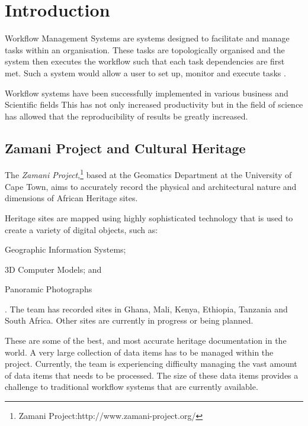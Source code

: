 
\chapter{Introduction}
    Workflow Management Systems are systems designed to facilitate and manage
    tasks within an organisation. These tasks are topologically organised and
    the system then executes the workflow
    such that each task dependencies are first met. Such a system would allow a user to
    set up, monitor and execute tasks \cite{slot2005workflow}.

    Workflow systems have been successfully implemented in various
    business and Scientific fields \cite{Brahe:2007:SWW:1316624.1316661}
    This has not only increased productivity but in the field of
    science has allowed that the reproducibility of results be greatly
    increased\cite{4721191}.




\section{Zamani Project and Cultural Heritage}
    The \emph{Zamani Project},\footnote{Zamani Project:http://www.zamani-project.org/}
    based at the Geomatics Department at the University of Cape Town,
    aims to accurately record the physical and architectural nature
    and dimensions of African Heritage sites.

    Heritage sites are mapped using highly sophisticated technology that is
    used to create a variety of digital objects, such as:
    \begin{inparaenum}[i)] \item Geographic Information Systems; \item 3D
    Computer Models; and \item Panoramic Photographs\end{inparaenum}.
    The team has recorded sites in Ghana, Mali, Kenya, Ethiopia, Tanzania and
    South Africa. Other sites are currently in progress or being planned.

    These are some of the best, and most accurate heritage documentation
    in the world.
    A very large collection of data items has to be managed
    within the project. Currently, the team is experiencing difficulty managing
    the vast amount of data items that needs to be processed. The size of these
    data items provides a challenge to traditional workflow systems that are
    currently available.


